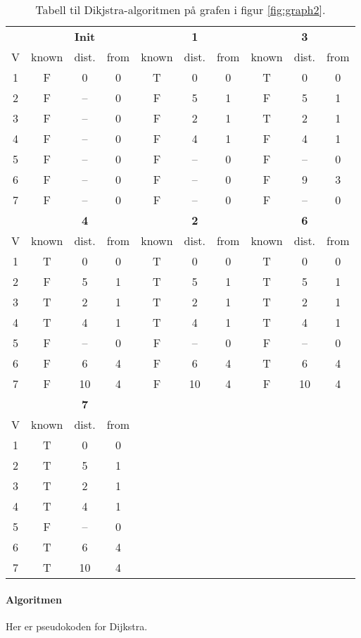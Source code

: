 \documentclass[11pt,a4paper]{article}
\theoremstyle{def}
\begin{document}
\begin{table}
\centering
\begin{tabular}{c|ccc|ccc|ccc}
&&\textbf{Init}&&&\textbf{1}&&&\textbf{3}\\
V & known & dist. & from&known&dist.&from&known&dist.&from\\
\hline
1 & F & 0 & 0&T&0&0&T&0&0\\
2 & F & -- & 0&F&5&1&F&5&1\\
3 & F & -- & 0&F&2&1&T&2&1\\
4 & F & -- & 0&F&4&1&F&4&1\\
5 & F & -- & 0&F&--&0&F&--&0\\
6 & F & -- & 0&F&--&0&F&9&3\\
7 & F & -- & 0&F&--&0&F&--&0\\
\hline
\hline
&&\textbf{4}&&&\textbf{2}&&&\textbf{6}\\
V & known & dist. & from&known&dist.&from&known&dist.&from\\
\hline
1&T&0&0&T&0&0&T&0&0\\
2&F&5&1&T&5&1&T&5&1\\
3&T&2&1&T&2&1&T&2&1\\
4&T&4&1&T&4&1&T&4&1\\
5&F&--&0&F&--&0&F&--&0\\
6&F&6&4&F&6&4&T&6&4\\
7&F&10&4&F&10&4&F&10&4\\
\hline
\hline
&&\textbf{7}&\\
V & known & dist. & from\\
\cline{1-4}
1&T&0&0\\
2&T&5&1\\
3&T&2&1\\
4&T&4&1\\
5&F&--&0\\
6&T&6&4\\
7&T&10&4\\
\end{tabular}
\label{tab:dijkstra}
\caption{Tabell til Dikjstra-algoritmen på grafen i figur \ref{fig:graph2}.}
\end{table}


\paragraph{Algoritmen} Her er pseudokoden for Dijkstra.
\end{document}
